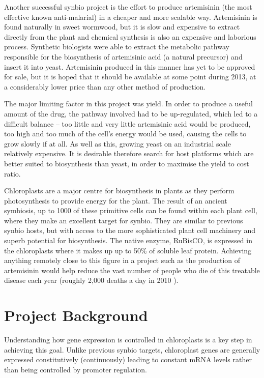 \documentclass[twoside,a4paper]{article}
\begin{document}
\begin{multicols}{2}
Another successful synbio project is the effort to produce artemisinin (the
most effective known anti-malarial) in a cheaper and more scalable way.
Artemisinin is found naturally in sweet wormwood, but it is slow and expensive
to extract directly from the plant and chemical synthesis is also an expensive
and laborious process.
Synthetic biologists were able to extract the metabolic pathway responsible for
the biosynthesis of artemisinic acid (a natural precursor) and insert it into 
yeast\cite{yeast}.
Artemisinin produced in this manner has yet to be approved for sale, but it is
hoped that it should be available at some point during 2013, at a considerably
lower price than any other method of production.

The major limiting factor in this project was yield.
In order to produce a useful amount of the drug, the pathway involved had to be
up-regulated, which led to a difficult balance -- too little and very little
artemisinic acid would be produced, too high and too much of the cell's
energy would be used, causing the cells to grow slowly if at all.
As well as this, growing yeast on an industrial scale relatively expensive.
It is desirable therefore search for host platforms which are better suited to
biosynthesis than yeast, in order to maximise the yield to cost ratio.

Chloroplasts are a major centre for biosynthesis in plants as they perform
photosynthesis to provide energy for the plant.
The result of an ancient symbiosis, up to 1000 of these primitive cells can be 
found within each plant cell, where they make an excellent target for synbio.
They are similar to previous synbio hosts, but with access to the more
sophisticated plant cell machinery and superb potential for biosynthesis.
The native enzyme, RuBisCO, is expressed in the chloroplasts where it makes up
up to 50\% of soluble leaf protein.
Achieving anything remotely close to this figure in a project such as the
production of artemisinin would help reduce the vast number of people who die 
of this treatable disease each year (roughly 2,000 deaths a day in 2010
\cite{malaria}).


\section{Project Background}

Understanding how gene expression is controlled in chloroplasts is a key step
in achieving this goal.
Unlike previous synbio targets, chloroplast genes are generally expressed
constitutively (continuously) leading to constant mRNA levels rather than 
being controlled by promoter regulation\cite{Sugita1996}.


\end{multicols}
\end{document}
